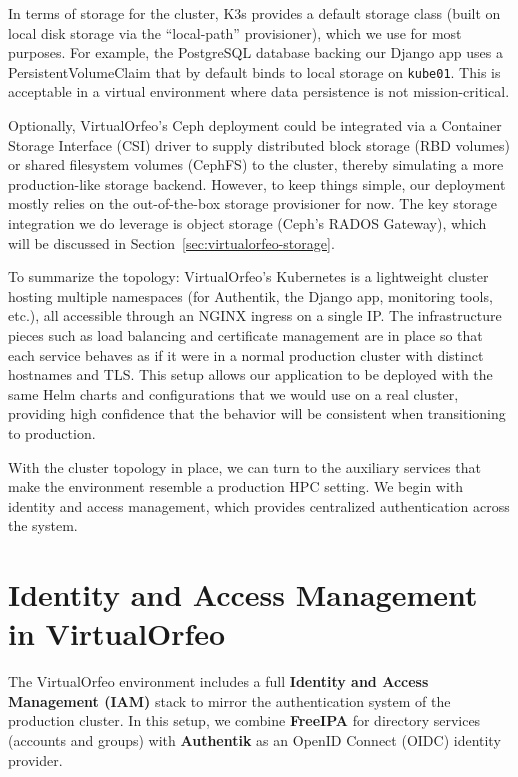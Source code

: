 \medskip

In terms of storage for the cluster, K3s provides a default storage class (built 
on local disk storage via the ``local-path'' provisioner), which we use for most 
purposes. For example, the PostgreSQL database backing our Django app uses a 
PersistentVolumeClaim that by default binds to local storage on 
\texttt{kube01}. This is acceptable in a virtual environment where data 
persistence is not mission-critical. 

Optionally, VirtualOrfeo’s Ceph deployment could be integrated via a Container 
Storage Interface (CSI) driver to supply distributed block storage (RBD volumes) 
or shared filesystem volumes (CephFS) to the cluster, thereby simulating a more 
production-like storage backend. However, to keep things simple, our deployment 
mostly relies on the out-of-the-box storage provisioner for now. The key storage 
integration we do leverage is object storage (Ceph’s RADOS Gateway), which will 
be discussed in Section~\ref{sec:virtualorfeo-storage}.

\medskip

To summarize the topology: VirtualOrfeo’s Kubernetes is a lightweight cluster 
hosting multiple namespaces (for Authentik, the Django app, monitoring tools, 
etc.), all accessible through an NGINX ingress on a single IP. The infrastructure 
pieces such as load balancing and certificate management are in place so that 
each service behaves as if it were in a normal production cluster with distinct 
hostnames and TLS. This setup allows our application to be deployed with the 
same Helm charts and configurations that we would use on a real cluster, 
providing high confidence that the behavior will be consistent when transitioning 
to production.


\medskip
\noindent With the cluster topology in place, we can turn to the auxiliary services 
that make the environment resemble a production HPC setting. 
We begin with identity and access management, which provides 
centralized authentication across the system.


\section{Identity and Access Management in VirtualOrfeo} \label{sec:virtualorfeo-iam}

The VirtualOrfeo environment includes a full \textbf{Identity and Access Management (IAM)} stack to mirror the authentication system of the production cluster. In this setup, we combine \textbf{FreeIPA} for directory services (accounts and groups) with \textbf{Authentik} as an OpenID Connect (OIDC) identity provider. 


